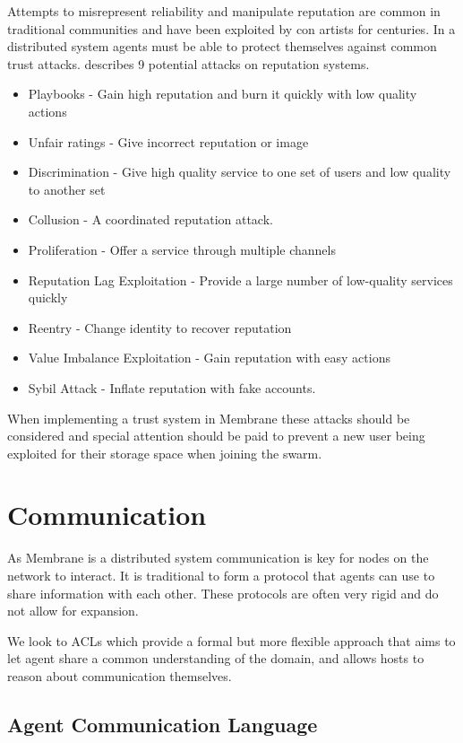\documentclass[11pt, a4paper, twocolumn, twoside]{report}
\begin{document}
Attempts to misrepresent reliability and manipulate reputation are common in traditional communities and have been exploited by con artists for centuries. In a distributed system agents must be able to protect themselves against common trust attacks. \cite{josang2009challenges} describes 9 potential attacks on reputation systems.

\begin{itemize}
 \item Playbooks - Gain high reputation and burn it quickly with low quality actions
 \item Unfair ratings - Give incorrect reputation or image
 \item Discrimination - Give high quality service to one set of users and low quality to another set
 \item Collusion - A coordinated reputation attack.
 \item Proliferation - Offer a service through multiple channels
 \item Reputation Lag Exploitation - Provide a large number of low-quality services quickly
 \item Reentry - Change identity to recover reputation
 \item Value Imbalance Exploitation - Gain reputation with easy actions
 \item Sybil Attack - Inflate reputation with fake accounts.
\end{itemize}

When implementing a trust system in Membrane these attacks should be considered and special attention should be paid to prevent a new user being exploited for their storage space when joining the swarm.

\section{Communication} \label{sec:comm}

As Membrane is a distributed system communication is key for nodes on the network to interact. It is traditional to form a protocol that agents can use to share information with each other. These protocols are often very rigid and do not allow for expansion.

We look to ACLs which provide a formal but more flexible approach that aims to let agent share a common understanding of the domain, and allows hosts to reason about communication themselves.

\subsection{Agent Communication Language}
\end{document}

